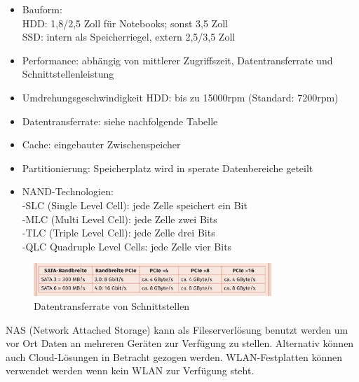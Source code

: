     \begin{tcolorbox}[width=15cm, center, title=Spezifikationen von Festplatten, coltitle=white, colframe=orange, colback=white!60!orange]
        \begin{itemize}[itemsep=0.1em, parsep=0.3em]
            \item Bauform\@: \\ HDD\@: 1,8/2,5 Zoll für Notebooks; sonst 3,5 Zoll \\ SSD\@: intern als Speicherriegel, extern 2,5/3,5 Zoll
            \item Performance\@: abhängig von mittlerer Zugriffszeit, Datentransferrate und Schnittstellenleistung
            \item Umdrehungsgeschwindigkeit HDD\@: bis zu 15000rpm (Standard: 7200rpm)
            \item Datentransferrate\@: siehe nachfolgende Tabelle
            \item Cache\@: eingebauter Zwischenspeicher
            \item Partitionierung\@: Speicherplatz wird in sperate Datenbereiche geteilt
            \item NAND-Technologien\@: \\ -SLC (Single Level Cell): jede Zelle speichert ein Bit \\ -MLC (Multi Level Cell): jede Zelle zwei Bits \\ -TLC (Triple Level Cell): jede Zelle drei Bits \\ -QLC {Quadruple Level Cells}: jede Zelle vier Bits
        \end{itemize}
    \end{tcolorbox}

    \begin{figure}[ht]
        \centering
        \includegraphics[width=0.8\textwidth]{./images/2.4.7_datentransferrate.png}
        \caption{Datentransferrate von Schnittstellen}\label{fig:Datentransferrate}
    \end{figure}

    \begin{subindent}
        NAS (Network Attached Storage) kann als Fileserverlösung benutzt werden um vor Ort Daten an mehreren Geräten zur Verfügung zu stellen.
        Alternativ können auch Cloud-Lösungen in Betracht gezogen werden. WLAN-Festplatten können verwendet werden wenn kein WLAN zur Verfügung steht.
    \end{subindent}

